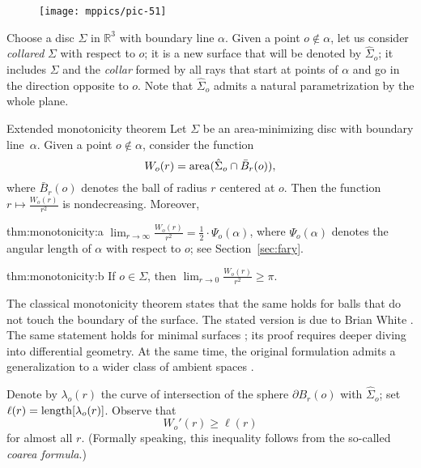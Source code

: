 \begin{wrapfigure}{r}{35 mm}
\vskip-5mm
\centering
\texttt{[image: mppics/pic-51]}
\vskip0mm
\end{wrapfigure}

Choose a disc $\Sigma$ in $\mathbb{R}^3$ with boundary line $\alpha$.
Given a point $o\notin \alpha$, let us consider \emph{collared} $\Sigma$ with respect to $o$;
it is a new surface that will be denoted by $\hat\Sigma_o$;
it includes $\Sigma$ and the \emph{collar} formed by all rays that start at points of $\alpha$ and go in the direction opposite to $o$.
Note that $\hat\Sigma_o$ admits a natural parametrization by the whole plane.

\begin{thm}{Extended monotonicity theorem}\label{thm:monotonicity}
Let $\Sigma$ be an area-minimizing disc with boundary line~$\alpha$.
Given a point $o\notin \alpha$, consider the function 
\[W_o(r)=\mathop{\rm area}\nolimits (\hat\Sigma_o\cap \bar B_r(o)),\]
where $\bar B_r(o)$ denotes the ball of radius $r$ centered at $o$.
Then the function $r\mapsto \frac{W_o(r)}{r^2}$
is nondecreasing. Moreover, 

\begin{subthm}{thm:monotonicity:a}
$\lim_{r\to\infty}\frac{W_o(r)}{r^2}=\tfrac12\cdot \Psi_o(\alpha)$, where $\Psi_o(\alpha)$ denotes the angular length of $\alpha$ with respect to $o$; see Section~\ref{sec:fary}.
\end{subthm}

\begin{subthm}{thm:monotonicity:b}
If $o\in \Sigma$, then $\lim_{r\to0}\frac{W_o(r)}{r^2}\ge \pi$.
\end{subthm}

\end{thm}

The classical monotonicity theorem states that the same holds for balls that do not touch the boundary of the surface.
The stated version is due to Brian White \cite{white}.
The same statement holds for minimal surfaces \cite{EWW_embed}; its proof requires deeper diving into differential geometry.
At the same time, the original formulation admits a generalization to a wider class of ambient spaces \cite{St_structure}.


Denote by $\lambda_o(r)$ the curve of intersection of the sphere $\partial B_r(o)$ with $\hat\Sigma_o$;
set $\ell(r)\z=\length[\lambda_o(r)]$.
Observe that 
\[W_o'(r)\ge \ell(r)\]
for almost all $r$.
(Formally speaking, this inequality follows from the so-called \emph{coarea formula}.)

